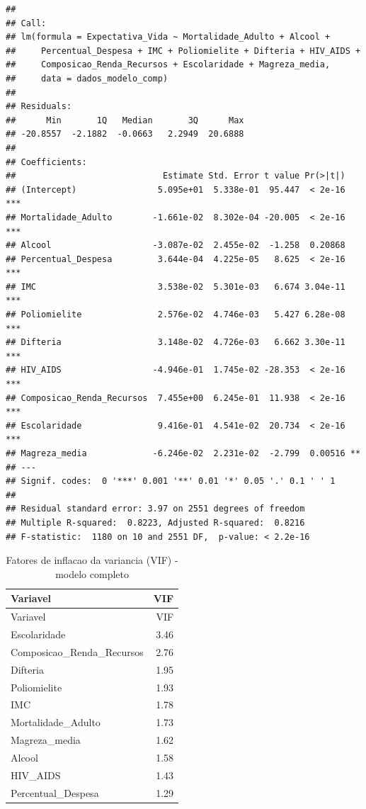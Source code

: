 \documentclass[
  12pt,
]{article}
\begin{document}
\begin{verbatim}
## 
## Call:
## lm(formula = Expectativa_Vida ~ Mortalidade_Adulto + Alcool + 
##     Percentual_Despesa + IMC + Poliomielite + Difteria + HIV_AIDS + 
##     Composicao_Renda_Recursos + Escolaridade + Magreza_media, 
##     data = dados_modelo_comp)
## 
## Residuals:
##      Min       1Q   Median       3Q      Max 
## -20.8557  -2.1882  -0.0663   2.2949  20.6888 
## 
## Coefficients:
##                             Estimate Std. Error t value Pr(>|t|)    
## (Intercept)                5.095e+01  5.338e-01  95.447  < 2e-16 ***
## Mortalidade_Adulto        -1.661e-02  8.302e-04 -20.005  < 2e-16 ***
## Alcool                    -3.087e-02  2.455e-02  -1.258  0.20868    
## Percentual_Despesa         3.644e-04  4.225e-05   8.625  < 2e-16 ***
## IMC                        3.538e-02  5.301e-03   6.674 3.04e-11 ***
## Poliomielite               2.576e-02  4.746e-03   5.427 6.28e-08 ***
## Difteria                   3.148e-02  4.726e-03   6.662 3.30e-11 ***
## HIV_AIDS                  -4.946e-01  1.745e-02 -28.353  < 2e-16 ***
## Composicao_Renda_Recursos  7.455e+00  6.245e-01  11.938  < 2e-16 ***
## Escolaridade               9.416e-01  4.541e-02  20.734  < 2e-16 ***
## Magreza_media             -6.246e-02  2.231e-02  -2.799  0.00516 ** 
## ---
## Signif. codes:  0 '***' 0.001 '**' 0.01 '*' 0.05 '.' 0.1 ' ' 1
## 
## Residual standard error: 3.97 on 2551 degrees of freedom
## Multiple R-squared:  0.8223, Adjusted R-squared:  0.8216 
## F-statistic:  1180 on 10 and 2551 DF,  p-value: < 2.2e-16
\end{verbatim}

\begin{longtable}[]{@{}lr@{}}
\caption{Fatores de inflacao da variancia (VIF) - modelo
completo}\tabularnewline
\toprule\noalign{}
Variavel & VIF \\
\midrule\noalign{}
\endfirsthead
\toprule\noalign{}
Variavel & VIF \\
\midrule\noalign{}
\endhead
\bottomrule\noalign{}
\endlastfoot
Escolaridade & 3.46 \\
Composicao\_Renda\_Recursos & 2.76 \\
Difteria & 1.95 \\
Poliomielite & 1.93 \\
IMC & 1.78 \\
Mortalidade\_Adulto & 1.73 \\
Magreza\_media & 1.62 \\
Alcool & 1.58 \\
HIV\_AIDS & 1.43 \\
Percentual\_Despesa & 1.29 \\
\end{longtable}
\end{document}
